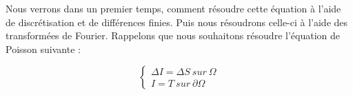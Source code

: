 Nous verrons dans un premier temps, comment résoudre cette équation à l'aide de discrétisation et de différences finies. Puis nous résoudrons celle-ci à l'aide des transformées de Fourier. 
Rappelons que nous souhaitons résoudre l'équation de Poisson suivante : 
\begin{center}

\begin{equation*}
    \left \{
    \begin{aligned}
    \Delta I = \Delta S \ sur \ \Omega\\
    I = T \ sur \ \partial \Omega
    \end{aligned}
    \right.
\end{equation*}
\end{center}

